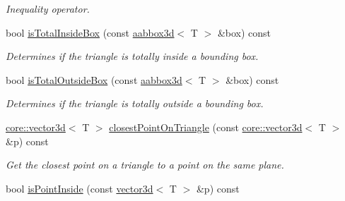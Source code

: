 \begin{DoxyCompactItemize}
\begin{DoxyCompactList}\small\item\em Inequality operator. \end{DoxyCompactList}\item 
bool \hyperlink{classirr_1_1core_1_1triangle3d_a9e7a8bba12fb314da35a9c249761a170}{is\+Total\+Inside\+Box} (const \hyperlink{classirr_1_1core_1_1aabbox3d}{aabbox3d}$<$ T $>$ \&box) const 
\begin{DoxyCompactList}\small\item\em Determines if the triangle is totally inside a bounding box. \end{DoxyCompactList}\item 
bool \hyperlink{classirr_1_1core_1_1triangle3d_a37e1822a18d88b08b2f9de9ed7e4ff84}{is\+Total\+Outside\+Box} (const \hyperlink{classirr_1_1core_1_1aabbox3d}{aabbox3d}$<$ T $>$ \&box) const 
\begin{DoxyCompactList}\small\item\em Determines if the triangle is totally outside a bounding box. \end{DoxyCompactList}\item 
\hyperlink{classirr_1_1core_1_1vector3d}{core\+::vector3d}$<$ T $>$ \hyperlink{classirr_1_1core_1_1triangle3d_a0318b5951c702a306223b0dff7c83128}{closest\+Point\+On\+Triangle} (const \hyperlink{classirr_1_1core_1_1vector3d}{core\+::vector3d}$<$ T $>$ \&p) const 
\begin{DoxyCompactList}\small\item\em Get the closest point on a triangle to a point on the same plane. \end{DoxyCompactList}\item 
bool \hyperlink{classirr_1_1core_1_1triangle3d_a2a35b829f8389c5548e19e28157979c9}{is\+Point\+Inside} (const \hyperlink{classirr_1_1core_1_1vector3d}{vector3d}$<$ T $>$ \&p) const \hypertarget{classirr_1_1core_1_1triangle3d_a2a35b829f8389c5548e19e28157979c9}{}\label{classirr_1_1core_1_1triangle3d_a2a35b829f8389c5548e19e28157979c9}


\end{DoxyCompactItemize}
